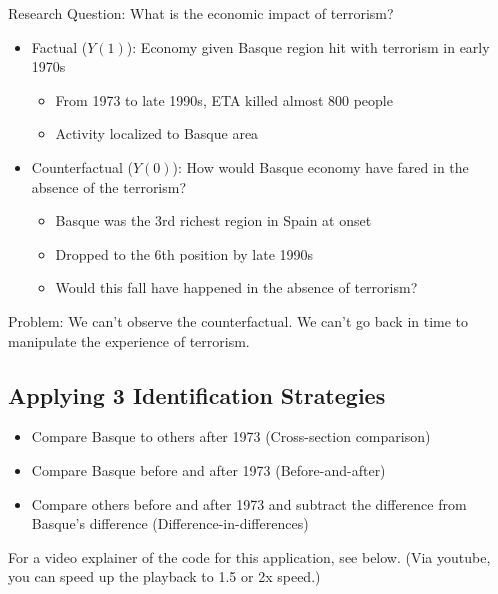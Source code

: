 \documentclass[
  letterpaper,
  DIV=11,
  numbers=noendperiod]{scrreprt}
\providecommand{\tightlist}{%
  \setlength{\itemsep}{0pt}\setlength{\parskip}{0pt}}\usepackage{longtable,booktabs,array}
\begin{document}
Research Question: What is the economic impact of terrorism?

\begin{itemize}
\tightlist
\item
  Factual (\(Y(1)\)): Economy given Basque region hit with terrorism in
  early 1970s

  \begin{itemize}
  \tightlist
  \item
    From 1973 to late 1990s, ETA killed almost 800 people
  \item
    Activity localized to Basque area
  \end{itemize}
\item
  Counterfactual (\(Y(0)\)): How would Basque economy have fared in the
  absence of the terrorism?

  \begin{itemize}
  \tightlist
  \item
    Basque was the 3rd richest region in Spain at onset
  \item
    Dropped to the 6th position by late 1990s
  \item
    Would this fall have happened in the absence of terrorism?
  \end{itemize}
\end{itemize}

Problem: We can't observe the counterfactual. We can't go back in time
to manipulate the experience of terrorism.

\hypertarget{applying-3-identification-strategies}{%
\subsection{Applying 3 Identification
Strategies}\label{applying-3-identification-strategies}}

\begin{itemize}
\tightlist
\item
  Compare Basque to others after 1973 (Cross-section comparison)
\item
  Compare Basque before and after 1973 (Before-and-after)
\item
  Compare others before and after 1973 and subtract the difference from
  Basque's difference (Difference-in-differences)
\end{itemize}

For a video explainer of the code for this application, see below. (Via
youtube, you can speed up the playback to 1.5 or 2x speed.)
\end{document}
